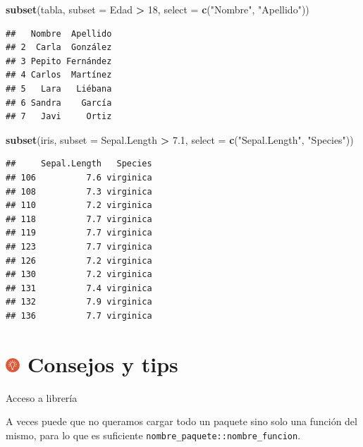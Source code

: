 \documentclass[11pt,]{book}
\newenvironment{Shaded}{\begin{snugshade}}{\end{snugshade}}
\newcommand{\DataTypeTok}[1]{\textcolor[rgb]{0.27,0.27,0.27}{#1}}
\newcommand{\DecValTok}[1]{\textcolor[rgb]{0.06,0.06,0.06}{#1}}
\newcommand{\FloatTok}[1]{\textcolor[rgb]{0.06,0.06,0.06}{#1}}
\newcommand{\KeywordTok}[1]{\textcolor[rgb]{0.27,0.27,0.27}{\textbf{#1}}}
\newcommand{\NormalTok}[1]{#1}
\newcommand{\OperatorTok}[1]{\textcolor[rgb]{0.43,0.43,0.43}{\textbf{#1}}}
\newcommand{\StringTok}[1]{\textcolor[rgb]{0.5,0.5,0.5}{#1}}
\begin{document}
\begin{Shaded}
\begin{Highlighting}[]
\KeywordTok{subset}\NormalTok{(tabla, }\DataTypeTok{subset =}\NormalTok{ Edad }\OperatorTok{>}\StringTok{ }\DecValTok{18}\NormalTok{, }\DataTypeTok{select =} \KeywordTok{c}\NormalTok{(}\StringTok{"Nombre"}\NormalTok{, }\StringTok{"Apellido"}\NormalTok{))}
\end{Highlighting}
\end{Shaded}

\begin{verbatim}
##   Nombre  Apellido
## 2  Carla  González
## 3 Pepito Fernández
## 4 Carlos  Martínez
## 5   Lara   Liébana
## 6 Sandra    García
## 7   Javi     Ortiz
\end{verbatim}

\begin{Shaded}
\begin{Highlighting}[]
\KeywordTok{subset}\NormalTok{(iris, }\DataTypeTok{subset =}\NormalTok{ Sepal.Length }\OperatorTok{>}\StringTok{ }\FloatTok{7.1}\NormalTok{, }\DataTypeTok{select =} \KeywordTok{c}\NormalTok{(}\StringTok{"Sepal.Length"}\NormalTok{, }\StringTok{"Species"}\NormalTok{))}
\end{Highlighting}
\end{Shaded}

\begin{verbatim}
##     Sepal.Length   Species
## 106          7.6 virginica
## 108          7.3 virginica
## 110          7.2 virginica
## 118          7.7 virginica
## 119          7.7 virginica
## 123          7.7 virginica
## 126          7.2 virginica
## 130          7.2 virginica
## 131          7.4 virginica
## 132          7.9 virginica
## 136          7.7 virginica
\end{verbatim}

\hypertarget{consejos-y-tips-4}{%
\section[ Consejos y tips]{\texorpdfstring{\protect\includegraphics[width=0.04\textwidth,height=\textheight]{img/logo_info.png} Consejos y tips}{ Consejos y tips}}\label{consejos-y-tips-4}}

Acceso a librería

A veces puede que no queramos cargar todo un paquete sino solo una función del mismo, para lo que es suficiente \texttt{nombre\_paquete::nombre\_funcion}.
\end{document}
